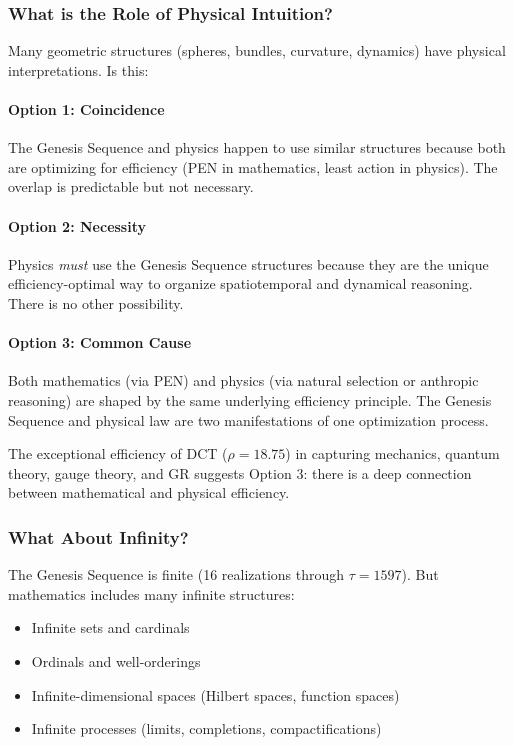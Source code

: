 \documentclass[11pt]{article}
\theoremstyle{definition}
\begin{document}
\subsubsection{What is the Role of Physical Intuition?}

Many geometric structures (spheres, bundles, curvature, dynamics) have physical interpretations. Is this:

\paragraph{Option 1: Coincidence}
The Genesis Sequence and physics happen to use similar structures because both are optimizing for efficiency (PEN in mathematics, least action in physics). The overlap is predictable but not necessary.

\paragraph{Option 2: Necessity}
Physics \emph{must} use the Genesis Sequence structures because they are the unique efficiency-optimal way to organize spatiotemporal and dynamical reasoning. There is no other possibility.

\paragraph{Option 3: Common Cause}
Both mathematics (via PEN) and physics (via natural selection or anthropic reasoning) are shaped by the same underlying efficiency principle. The Genesis Sequence and physical law are two manifestations of one optimization process.

The exceptional efficiency of DCT ($\rho=18.75$) in capturing mechanics, quantum theory, gauge theory, and GR suggests Option 3: there is a deep connection between mathematical and physical efficiency.

\subsubsection{What About Infinity?}

The Genesis Sequence is finite (16 realizations through $\tau=1597$). But mathematics includes many infinite structures:

\begin{itemize}
\item Infinite sets and cardinals
\item Ordinals and well-orderings
\item Infinite-dimensional spaces (Hilbert spaces, function spaces)
\item Infinite processes (limits, completions, compactifications)
\end{itemize}
\end{document}
